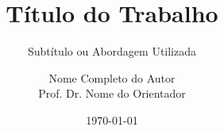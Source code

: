\title{Título do Trabalho}
\subtitle{Subtítulo ou Abordagem Utilizada}
\author[Nome do Autor]{Nome Completo do Autor \\ \medskip \scriptsize Prof. Dr. Nome do Orientador}
\date{\today}
